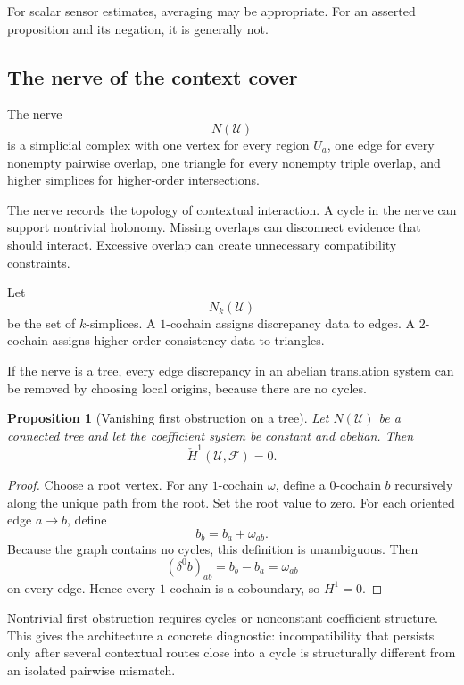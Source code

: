 \documentclass[11pt]{article}
\newtheorem{proposition}[definition]{Proposition}
\theoremstyle{definition}
\begin{document}
For scalar sensor estimates, averaging may be appropriate. For an asserted proposition and its negation, it is generally not.

\subsection{The nerve of the context cover}

The nerve
\[
N(\mathcal U)
\]
is a simplicial complex with one vertex for every region \(U_a\), one edge for every nonempty pairwise overlap, one triangle for every nonempty triple overlap, and higher simplices for higher-order intersections.

The nerve records the topology of contextual interaction. A cycle in the nerve can support nontrivial holonomy. Missing overlaps can disconnect evidence that should interact. Excessive overlap can create unnecessary compatibility constraints.

Let
\[
N_k(\mathcal U)
\]
be the set of \(k\)-simplices. A \(1\)-cochain assigns discrepancy data to edges. A \(2\)-cochain assigns higher-order consistency data to triangles.

If the nerve is a tree, every edge discrepancy in an abelian translation system can be removed by choosing local origins, because there are no cycles.

\begin{proposition}[Vanishing first obstruction on a tree]
Let \(N(\mathcal U)\) be a connected tree and let the coefficient system be constant and abelian. Then
\[
\check H^1(\mathcal U,\mathscr F)=0.
\]
\end{proposition}

\begin{proof}
Choose a root vertex. For any \(1\)-cochain \(\omega\), define a \(0\)-cochain \(b\) recursively along the unique path from the root. Set the root value to zero. For each oriented edge \(a\to b\), define
\[
b_b=b_a+\omega_{ab}.
\]
Because the graph contains no cycles, this definition is unambiguous. Then
\[
(\delta^0b)_{ab}
=
b_b-b_a
=
\omega_{ab}
\]
on every edge. Hence every \(1\)-cochain is a coboundary, so \(H^1=0\).
\end{proof}

Nontrivial first obstruction requires cycles or nonconstant coefficient structure. This gives the architecture a concrete diagnostic: incompatibility that persists only after several contextual routes close into a cycle is structurally different from an isolated pairwise mismatch.
\end{document}
